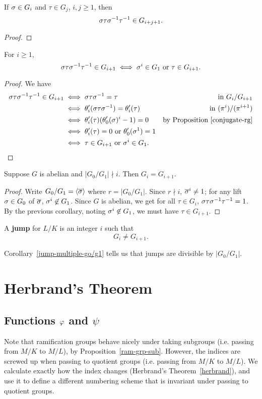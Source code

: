 \begin{pr}
If $\sigma\in G_i$ and $\tau\in G_j$, $i,j\ge 1$, then 
\[
\sigma\tau\sigma^{-1}\tau^{-1}\in G_{i+j+1}.
\]
\end{pr}
\begin{proof}
\end{proof}
\begin{cor}
For $i\ge 1$,
\[
\sigma\tau\sigma^{-1}\tau^{-1}\in G_{i+1}\iff \sigma^i\in G_1\text{ or }\tau\in G_{i+1}.
\]
\end{cor}
\begin{proof}
We have
\begin{align*}
\si\tau\si^{-1}\tau^{-1}\in G_{i+1}
&\iff  \si\tau\si^{-1} = \tau& \text{ in }G_i/G_{i+1}\\
&\iff  \te_i'(\si\tau\si^{-1}) = \te_i' (\tau) &\text{ in }(\pi^i)/(\pi^{i+1})\\
&\iff  \te_i'(\tau)%
(\te_0'(\si)^i-1)
=0
&\text{by Proposition~\ref{conjugate-rg}}\\
&\iff \te_i'(\tau)=0\text{ or }\te_0'(\si^1)=1\\
&\iff \tau\in G_{i+1}\text{ or }\si^i\in G_1.
\end{align*}
\end{proof}
\begin{cor}
Suppose $G$ is abelian and $|G_0/G_1|\nmid i$. Then $G_i=G_{i+1}$.
\end{cor}
\begin{proof}
Write $G_0/G_1=\left\langle {\overline{\sigma}}\right\rangle$ where $r=|G_0/G_1|$. Since $r\nmid i$, $\overline{\sigma}^i\ne 1$; for any lift $\sigma\in G_0$ of $\overline{\sigma}$, $\sigma^i\not\in G_1$. Since $G$ is abelian, we get for all $\tau\in G_i$, $\sigma\tau\sigma^{-1}\tau^{-1}=1$. By the previous corollary, noting $\sigma^i\not\in G_1$, we must have $\tau\in G_{i+1}$.
\end{proof}
\begin{df}
A \textbf{jump} for $L/K$ is an integer $i$ such that
\[
G_i\ne G_{i+1}.
\]
\end{df}
Corollary~\ref{jump-multiple-go/g1} tells us that jumps are divisible by $|G_0/G_1|$.
\section{Herbrand's Theorem}
\subsection{Functions $\varphi$ and $\psi$}
Note that ramification groups behave nicely under taking subgroups (i.e. passing from $M/K$ to $M/L$), by Proposition~\ref{ram-grp-sub}.
However, the indices are screwed up when passing to quotient groups (i.e. passing from $M/K$ to $M/L$). We calculate exactly how the index changes (Herbrand's Theorem~\ref{herbrand}), and use it to define a different numbering scheme that is invariant under passing to quotient groups.

